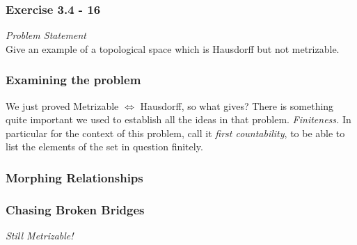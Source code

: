 
\begin{frame}
    \frametitle{Exercise 3.4 - 16}
    \textit{Problem Statement}\\
    Give an example of a topological space which is Hausdorff but not
    metrizable.
\end{frame}

\begin{frame}
    \frametitle{Examining the problem}

    We just proved Metrizable \(\Leftrightarrow\) Hausdorff, so what gives?
    \pause
    There is something quite important we used to establish all the ideas in
    that problem. 
    \pause
    \emph{Finiteness.} \pause In particular for the context of this problem,
    call it \emph{first countability}\pause, to be able to list the elements of
    the set in question finitely. %

\end{frame}

\begin{frame}
    \frametitle{Morphing Relationships}
    \centering

\end{frame}

\begin{frame}
    \frametitle{Chasing Broken Bridges}

    \begin{figure}
        \scalebox{1.4}{}
    \end{figure}


    \pause

    \begin{center}
        \emph{Still Metrizable!}
    \end{center}

\end{frame}

